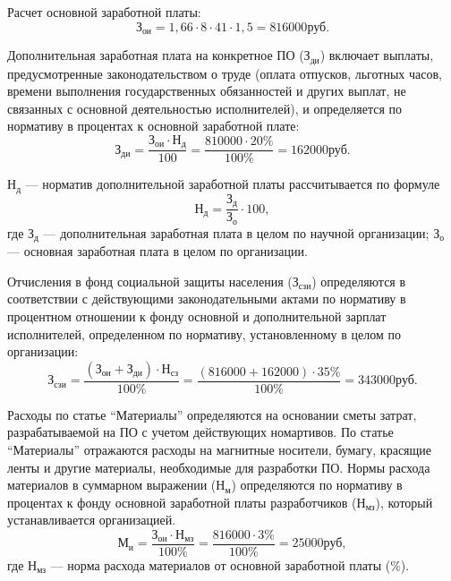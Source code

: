 Расчет основной заработной платы:
\begin{displaymath}
  \text{З}_{\text{ои}} = 1,66 \cdot 8 \cdot 41 \cdot 1,5 = 816000 \text{руб}.
\end{displaymath}

Дополнительная заработная плата на конкретное ПО (\( \text{З}_{\text{ди}} \)) включает выплаты, предусмотренные законодательством о труде (оплата отпусков, льготных часов, времени выполнения государственных обязанностей и других выплат, не связанных с основной деятельностью исполнителей), и определяется по нормативу в процентах к основной заработной плате:
\begin{displaymath}
  \text{З}_{\text{ди}} = \frac{\text{З}_{\text{ои}} \cdot \text{Н}_{\text{д}}}{100} = \frac{810000 \cdot 20\%}{100\%} = 162000 \text{руб.}
\end{displaymath}

\( \text{Н}_{\text{д}} \) --- норматив дополнительной заработной платы рассчитывается по формуле
\begin{displaymath}
  \text{Н}_{\text{д}} = \frac{\text{З}_{\text{д}}}{\text{З}_{\text{о}}} \cdot 100,
\end{displaymath}
где \( \text{З}_{\text{д}} \) --- дополнительная заработная плата в целом по научной организации; \( \text{З}_{\text{о}} \) --- основная заработная плата в целом по организации.

Отчисления в фонд социальной защиты населения (\( \text{З}_{\text{сзи}} \)) определяются в соответствии с действующими законодательными актами по нормативу в процентном отношении к фонду основной и дополнительной зарплат исполнителей, определенном по нормативу, установленному в целом по организации:
\begin{displaymath}
  \text{З}_{\text{сзи}} = \frac{(\text{З}_{\text{ои}} + \text{З}_{\text{ди}}) \cdot \text{Н}_{\text{сз}}}{100\%} = \frac{(816000 + 162000) \cdot 35\%}{100\%} = 343000 \text{руб}.
\end{displaymath}

Расходы по статье ``Материалы'' определяются на основании сметы затрат, разрабатываемой на ПО с учетом действующих номартивов. По статье ``Материалы'' отражаются расходы на магнитные носители, бумагу, красящие ленты и другие материалы, необходимые для разработки ПО. Нормы расхода материалов в суммарном выражении (\( \text{Н}_{\text{м}} \)) определяются по нормативу в процентах к фонду основной заработной платы разработчиков (\( \text{Н}_{\text{мз}} \)), который устанавливается организацией.
\begin{displaymath}
  \text{М}_{\text{и}} = \frac{\text{З}_{\text{ои}} \cdot \text{Н}_{\text{мз}}}{100\%} = \frac{816000 \cdot 3\%}{100\%} = 25000 \text{руб},
\end{displaymath}
где \( \text{Н}_{\text{мз}} \) --- норма расхода материалов от основной заработной платы (\( \% \)).

